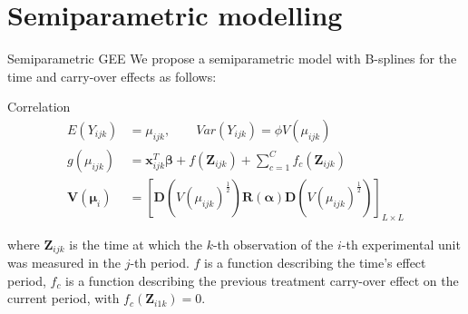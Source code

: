 \documentclass[t,9pt]{beamer}
\begin{document}
\backgroundimageonslide{}
\backgroundimageonslide{}
\section{Semiparametric modelling}
\begin{frame}[fragile]{Semiparametric GEE}
We propose a semiparametric model with B-splines for the time and carry-over effects as follows:
 \begin{block}{Correlation }
\begin{align*}
     E(Y_{ijk})&=\mu_{ijk}, \qquad Var(Y_{ijk})=\phi V(\mu_{ijk})\nonumber \\
     g(\mu_{ijk})&=\pmb{x}_{ijk}^T\pmb{\beta} + f(\pmb{Z}_{ijk})+ \sum_{c=1}^C f_c(\pmb{Z}_{ijk})\\
     \pmb{V}(\pmb{\mu}_i)&=\left[\pmb{D}(V(\mu_{ijk})^{\frac{1}{2}}) \pmb{R}(\pmb{\pmb{ \alpha}}) \pmb{D}({V}(\mu_{ijk})^{\frac{1}{2}})\right]_{ L\times L}
\end{align*}
 \end{block} 
 where $\pmb{Z}_{ijk}$ is the time at which the $k$-th observation of the $i$-th experimental unit was measured in the $j$-th period.  $f$  is a function describing the time’s effect period, $f_c$ is a function describing the previous treatment carry-over effect on the current period, with $f_c(\pmb{Z}_{i1k})=0$.
\end{frame}
\end{document}
